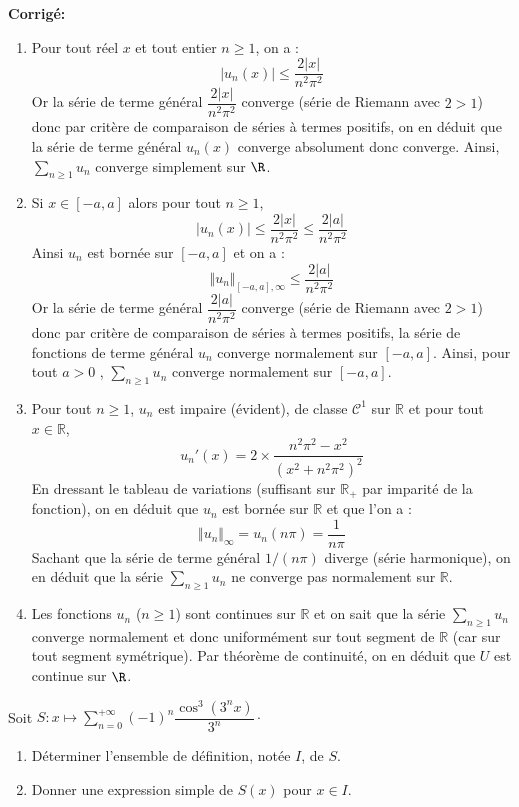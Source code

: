 \documentclass[a4paper,twoside,french,11pt]{VcCours}
\newcommand{\Sum}[2]{\sum_{#1}^{#2}}
\newcommand{\corr}{\textbf{Corrigé:}}
\begin{document}
\corr \begin{enumerate}
\item Pour tout réel $x$ et tout entier $n \geq 1$, on a :
$$\left| u_{n}\left( x\right) \right| \leq 
\frac{2\left| x\right| }{n^{2}\pi ^{2}}$$
Or la série de terme général $\dfrac{2\left| x\right| }{n^{2}\pi ^{2}}$ converge (série de Riemann avec $2>1$) donc par critère de comparaison de séries à termes positifs, on en déduit que la série de terme général $u_{n}\left( x\right) $ converge absolument donc converge. Ainsi, $\Sum{n \geq 1}{} u_n$ converge simplement sur $\R$.
\item Si $x\in \left[ -a,a\right] $ alors pour tout $n \geq 1$, 
$$\left| u_{n}\left( x\right) \right| \leq \frac{2\left| x\right| }{n^{2}\pi ^{2}}\leq \frac{2\left|
a\right| }{n^{2}\pi ^{2}}$$
Ainsi $u_n$ est bornée sur $[-a,a]$ et on a :
$$ \Vert u_n \Vert_{[-a,a], \infty} \leq  \frac{2\left|a\right| }{n^{2}\pi ^{2}}$$
Or la série de terme général $\dfrac{2\left| a\right| }{n^{2}\pi ^{2}}$ converge (série de Riemann avec $2>1$) donc par critère de comparaison de séries à termes positifs, la série de fonctions de terme général $u_n$ converge normalement sur $[-a,a]$. Ainsi, pour tout $a > 0$ , $\Sum{n \geq 1}{} u_n$ converge normalement sur $[-a,a]$.
\item Pour tout $n \geq 1$, $u_n$ est impaire (évident), de classe $\mathcal{C}^1$ sur $\mathbb{R}$ et pour tout $x \in \mathbb{R}$,
$$u_n'(x) = 2 \times \frac{n^2\pi^2-x^2}{(x^2+n^2 \pi^2)^2}$$
En dressant le tableau de variations (suffisant sur $\mathbb{R}_+$ par imparité de la fonction), on en déduit que $u_n$ est bornée sur $\mathbb{R}$ et que l'on a :
$$ \Vert u_n \Vert_{\infty} = u_n( n \pi) = \frac{1}{n \pi}$$
Sachant que la série de terme général $1/(n\pi)$ diverge (série harmonique), on en déduit que la série $\Sum{n \geq 1}{} u_{n}$ ne converge pas normalement sur $\mathbb{R}$.
\item Les fonctions $u_{n}$ ($n \geq 1$) sont continues sur $\mathbb{R}$ et on sait que la série $\Sum{n \geq 1}{} u_{n}$ converge normalement et donc uniformément sur tout segment de $\mathbb{R}$ (car sur tout segment symétrique). Par théorème de continuité, on en déduit que $U$ est continue sur $\R$.
\end{enumerate}

\medskip

\begin{Exercice}{} Soit $S : x \mapsto \sum_{n=0}^{+ \infty}  (-1)^n \dfrac{\cos^3(3^nx)}{3^n} \cdot$

\begin{enumerate}
\item Déterminer l'ensemble de définition, notée $I$, de $S$.
\item Donner une expression simple de $S(x)$ pour $x \in I$.
\end{enumerate}
\end{Exercice}
\end{document}
